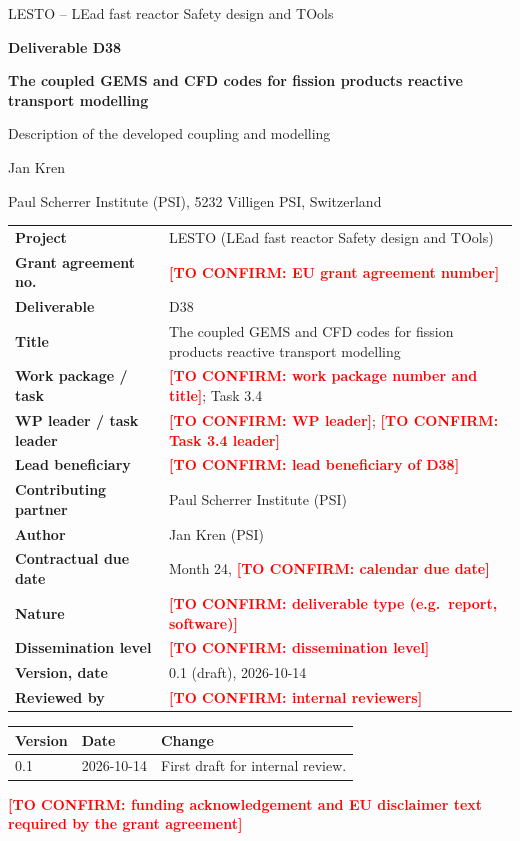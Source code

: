 \documentclass[11pt,a4paper]{article}
\newcommand{\TC}[1]{\textcolor{red}{\textbf{[TO CONFIRM: #1]}}}
\begin{document}
\begin{titlepage}
\centering
\vspace*{1cm}
{\large LESTO -- LEad fast reactor Safety design and TOols\par}
\vspace{1.2cm}
{\Large\bfseries Deliverable D38\par}
\vspace{0.6cm}
{\LARGE\bfseries The coupled GEMS and CFD codes for fission products
reactive transport modelling\par}
\vspace{0.4cm}
{\large Description of the developed coupling and modelling\par}
\vspace{1.2cm}
{\large Jan Kren\par}
{Paul Scherrer Institute (PSI), 5232 Villigen PSI, Switzerland\par}
\vspace{1.2cm}

\renewcommand{\arraystretch}{1.25}
\begin{tabularx}{0.9\textwidth}{>{\bfseries}l X}
\toprule
Project & LESTO (LEad fast reactor Safety design and TOols)\\
Grant agreement no. & \TC{EU grant agreement number}\\
Deliverable & D38 \\
Title & The coupled GEMS and CFD codes for fission products reactive
        transport modelling\\
Work package / task & \TC{work package number and title}; Task 3.4\\
WP leader / task leader & \TC{WP leader}; \TC{Task 3.4 leader}\\
Lead beneficiary & \TC{lead beneficiary of D38}\\
Contributing partner & Paul Scherrer Institute (PSI)\\
Author & Jan Kren (PSI)\\
Contractual due date & Month 24, \TC{calendar due date}\\
Nature & \TC{deliverable type (e.g.\ report, software)}\\
Dissemination level & \TC{dissemination level}\\
Version, date & 0.1 (draft), 2026-10-14\\
Reviewed by & \TC{internal reviewers}\\
\bottomrule
\end{tabularx}

\vspace{0.8cm}
\begin{tabularx}{0.9\textwidth}{l l X}
\toprule
\textbf{Version} & \textbf{Date} & \textbf{Change}\\
\midrule
0.1 & 2026-10-14 & First draft for internal review.\\
\bottomrule
\end{tabularx}

\vfill
{\small\TC{funding acknowledgement and EU disclaimer text required by
the grant agreement}\par}
\end{titlepage}
\end{document}
